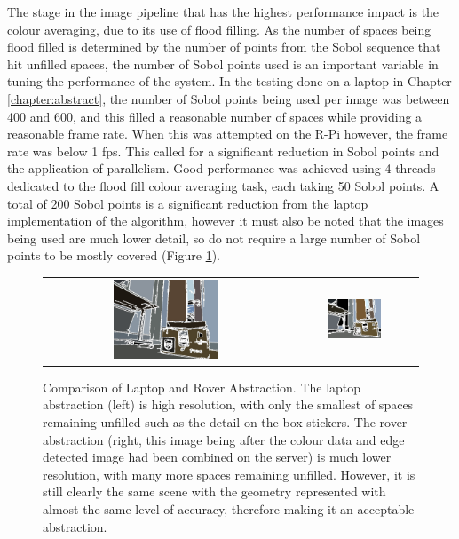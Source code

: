 The stage in the image pipeline that has the highest performance impact is the colour averaging, due to its use of flood filling. As the number of spaces being flood filled is determined by the number of points from the Sobol sequence that hit unfilled spaces, the number of Sobol points used is an important variable in tuning the performance of the system. In the testing done on a laptop in Chapter \ref{chapter:abstract}, the number of Sobol points being used per image was between 400 and 600, and this filled a reasonable number of spaces while providing a reasonable frame rate. When this was attempted on the R-Pi however, the frame rate was below 1 fps. This called for a significant reduction in Sobol points and the application of parallelism. Good performance was achieved using 4 threads dedicated to the flood fill colour averaging task, each taking 50 Sobol points. A total of 200 Sobol points is a significant reduction from the laptop implementation of the algorithm, however it must also be noted that the images being used are much lower detail, so do not require a large number of Sobol points to be mostly covered (Figure \ref{fig:LvsR}). 

\begin{figure}[H]
    \begin{center}
    \begin{tabular}{ c c }
        \includegraphics[width=0.45\textwidth]{Figures/abstractcompL.jpg} &
        \includegraphics[width=0.45\textwidth]{Figures/abstractcompR.jpg}
    \end{tabular}
    \caption[Comparison of Laptop and Rover Abstraction]{Comparison of Laptop and Rover Abstraction. The laptop abstraction (left) is high resolution, with only the smallest of spaces remaining unfilled such as the detail on the box stickers. The rover abstraction (right, this image being after the colour data and edge detected image had been combined on the server) is much lower resolution, with many more spaces remaining unfilled. However, it is still clearly the same scene with the geometry represented with almost the same level of accuracy, therefore making it an acceptable abstraction.}
    \label{fig:LvsR}
    \end{center}
\end{figure}


